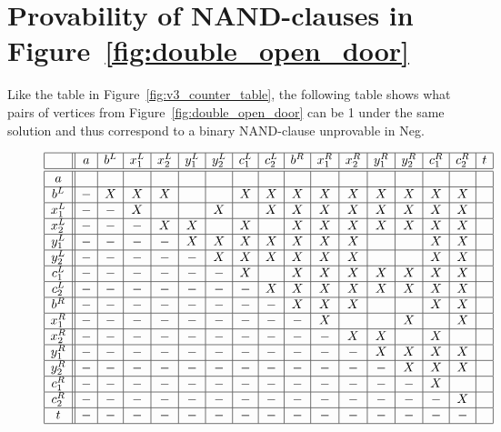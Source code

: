 \section{Provability of NAND-clauses in Figure~\ref{fig:double_open_door}}
\label{sec:Provability of NAND-clauses in double door}
Like the table in Figure~\ref{fig:v3_counter_table}, the following table shows what pairs of vertices from Figure~\ref{fig:double_open_door} can be 1 under the same solution and thus correspond to a binary NAND-clause unprovable in Neg.
\begin{figure}[!h]
  \centering
  \[\begin{array}{|c||c|c|c|c|c|c|c|c|c|c|c|c|c|c|c|c|c|c|}
    \hline
          & a & b^L & x^L_1 & x^L_2 & y^L_1 & y^L_2 & c^L_1 & c^L_2 & b^R & x^R_1 & x^R_2 & y^R_1 & y^R_2 & c^R_1 & c^R_2 & t\\ \hline\hline
    a     & & & & & & & & & & & & & & & & \\ \hline
    b^L   &-& X & X & X & & & X & X & X & X & X & X & X & X & X & \\ \hline
    x^L_1 &-&-& X & & & X & & X & X & X & X & X & X & X & X & \\ \hline
    x^L_2 &-&-&-& X & X & & X & & X & X & X & X & X & X & X & \\ \hline
    y^L_1 &-&-&-&-& X & X & X & X & X & X & X & & & X & X & \\ \hline
    y^L_2 &-&-&-&-&-& X & X & X & X & X & X & & & X & X & \\ \hline
    c^L_1 &-&-&-&-&-&-& X & & X & X & X & X & X & X & X & \\ \hline
    c^L_2 &-&-&-&-&-&-&-& X & X & X & X & X & X & X & X & \\ \hline
    b^R   &-&-&-&-&-&-&-&-& X & X & X & & & X & X & \\ \hline
    x^R_1 &-&-&-&-&-&-&-&-&-& X & & & X & & X & \\ \hline
    x^R_2 &-&-&-&-&-&-&-&-&-&-& X & X & & X & & \\ \hline
    y^R_1 &-&-&-&-&-&-&-&-&-&-&-& X & X & X & X & \\ \hline
    y^R_2 &-&-&-&-&-&-&-&-&-&-&-&-& X & X & X & \\ \hline
    c^R_1 &-&-&-&-&-&-&-&-&-&-&-&-&-& X & & \\ \hline
    c^R_2 &-&-&-&-&-&-&-&-&-&-&-&-&-&-& X & \\ \hline
    t     &-&-&-&-&-&-&-&-&-&-&-&-&-&-&-& \\ \hline
  \end{array}\]
  \caption{}
  \label{fig:double_door_counter_table}
\end{figure}
